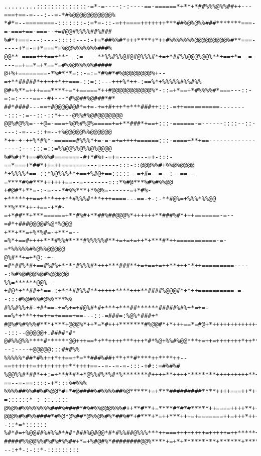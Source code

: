 \documentclass[12pt]{article}
\begin{document}
\begin{verbatim}
.........::::::::::::::-=*-=----:-:----==-======*+**+*##%%%@%%##++---===+==-=---:--=-*#%@@@@@@@@@@@%
*#*=--========-:::::::-:=*=-::-=++====+++++++***##%@%@%%###*******===-=-===+==-===--+=#@@#%%%%##%###
%#*+===---:----:::::---:-+=*##%%#*+++****+*++#%%%%%%%@@@@@@@@@%#**===-----+*=-=+*===*=%@@%%%%%%%###%
@@**-====+++==+***--:=----**%%#%%@#@#@%%%#*+=+*##%%@@@%@@%**+==+*=--=----==+==*=+*==*=#%%@%%%%%#####
@+%+========-*%#***=::-=:=*#%#*#%@@@@@@@@%+--=+**#####*+++++*++===-::=::---+++%*++-:==%*+%%%%%#%%#%%
@#+%**=+++===****+=*+=====*++#@@@@@@@@@@@%*-::=+*==+*#%%%%#*===---::-=:=:----==--#+---*#%@##%@###*#*
##*####---==+#@@@@#@#*=+=-+=+#+++*+***###++:::-=++==========--------:::-:=--::-::*+---@%%#%@#@@@@@@@
@@%#@%%=--+@=-===+%@%#%@%=====+=+**###*+==+:::-======-=------::::--::----:-=---::+=--+%@@@@@%%@@@@@@
*++-+-++%*#%*-======#%%%*+=-=-=+=++++======:::-====+**+==-----------------:---:::=::=%%@@%%@%%@%@@@@
%#%#+*+==#%%%#=======-#+*#%+-=+=--------=+-:::-==*===+*##*++=++=======---=-----:::-::@@@%%#+%%@%@@@@
*+%%%%*==-::*%@%%%**+==+%#@+==:::::--=+#=--=--:--==--=****#%#***++++++==--=-------:::*%#@***%#%#%%@@
+#@#*+**=-:-=---*#%%***+*%@%=------=+*#%-+*****++==+***+++**#%%%#***+++====---==-+-:-**#@%=+%%%*%%@@
**%***++-+==-+*#-=+*##**+***======+**#%#+**##%##@@@%*++++++**###%#*+++=======-=--=#*+###@@@@#%@*%@@@
+**+**=+%*%#=-+***=--=%*+==#++++***#%%#****#%%%%%#**+=+=+=++*+***#*++===========-=-=*%%%%%#%@%%@@@@@
@%#**+=+*@:-+-=#*##%*#+==#%#%+****#%%%#*+++***###**+=+==+=++**+++**++=========-----:%#%@#@@%@#%@@@@@
%%=******@@%--+#@*+**##+*==-:+***##%%#**+++++****+++**####%@@@#*+*++==========-=--:::#%@#%%#@%%***%%
#%%#%%+#-+#*==-+=%+=+#@%#*#+***+***##******#####%#%+*=+=-==%*+***++=++=+====+==---::-=###=:%@%*###+*
#@%#%#%%%#***+***+@@@%*++*=*#+++*******#%@@#*+*+++==*=#@+*+++++++++++++++==+===--:::--@@@@@+.####*#*
@#%%@%%****#******@@+++==*+**++++***+++*#*%@+%%#%@@***+=++=+++++++*++**++++===---:----+@@@@@:::###%%
%%%%%*##*#%+++*++==+*=**###%##+**+**#****++****++--==++++++=+++++++++**++++==--=--=-=-:::-+#::=#%#%#
%@@%%#*##*++:=+**#*#*+*@%%#%*%#*%*******#++++**++++********+++++++++**++++=+-==--=-==::::-+*:::%#%%%
%%%%##%%##%#%@@*#+*#@####%#%%%%##%@*****+=+***#########****++++===++*++++=======+-=::::::*-:-::..:::
@%@%#%%%%%%%%###%####*#%#%%@@@%%%#++**#**+=****#*#*#*****++====++++**+++=======+=-::::=++:::*+:..:::
@@@%#%#%%####*#%@*@%##*@%%@%#%*##%#*+#***+*=++***+++=+=======++=+++*++++++=++=*+-::::++--::*=*::::::
%#*#=+%@@##%#%%#*##*###%@#@@*#*#%%##@%%%***++===++++++++=+++++=++*****++++++*#=-:::++-:-::*=-:::::::
#####%%@@%%#%#%#%%##+*=+%#@#%*########@@%****+=+*+*********+******+******#*%+=---:+*-:-::*-:::::::::

\end{verbatim}
\end{document}
